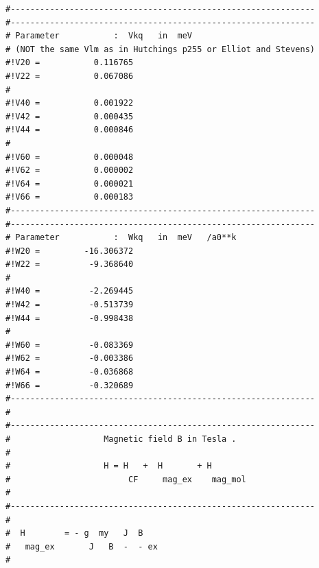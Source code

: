 \begin{enumerate}
{\begin{verbatim}
#-------------------------------------------------------------- 
#-------------------------------------------------------------- 
# Parameter           :  Vkq   in  meV                           
# (NOT the same Vlm as in Hutchings p255 or Elliot and Stevens)
#!V20 =           0.116765                                     
#!V22 =           0.067086                                     
#                                                              
#!V40 =           0.001922                                     
#!V42 =           0.000435                                     
#!V44 =           0.000846                                     
#                                                              
#!V60 =           0.000048                                     
#!V62 =           0.000002                                     
#!V64 =           0.000021                                     
#!V66 =           0.000183                                     
#-------------------------------------------------------------- 
#-------------------------------------------------------------- 
# Parameter           :  Wkq   in  meV   /a0**k                  
#!W20 =         -16.306372                                     
#!W22 =          -9.368640                                     
#                                                              
#!W40 =          -2.269445                                     
#!W42 =          -0.513739                                     
#!W44 =          -0.998438                                     
#                                                              
#!W60 =          -0.083369                                     
#!W62 =          -0.003386                                     
#!W64 =          -0.036868                                     
#!W66 =          -0.320689                                     
#-------------------------------------------------------------- 
#
#-------------------------------------------------------------- 
#                   Magnetic field B in Tesla .                    
#                                                              
#                   H = H   +  H       + H                     
#                        CF     mag_ex    mag_mol              
#                                                              
#--------------------------------------------------------------
#                                                              
#  H        = - g  my   J  B                                   
#   mag_ex       J   B  -  - ex                                
#                                                              

\end{verbatim}}
\end{enumerate}

